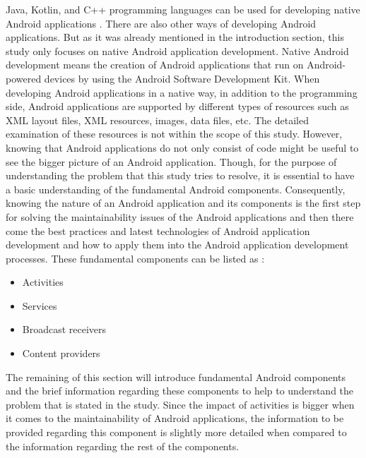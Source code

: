 Java, Kotlin, and C++ programming languages can be used for developing native Android applications \cite{9}. There are also other ways of developing Android applications. But as it was already mentioned in the introduction section, this study only focuses on native Android application development. Native Android development means the creation of Android applications that run on Android-powered devices by using the Android Software Development Kit. When developing Android applications in a native way, in addition to the programming side, Android applications are supported by different types of resources such as XML layout files, XML resources, images, data files, etc. The detailed examination of these resources is not within the scope of this study. However, knowing that Android applications do not only consist of code might be useful to see the bigger picture of an Android application. Though, for the purpose of understanding the problem that this study tries to resolve, it is essential to have a basic understanding of the fundamental Android components. Consequently, knowing the nature of an Android application and its components is the first step for solving the maintainability issues of the Android applications and then there come the best practices and latest technologies of Android application development and how to apply them into the Android application development processes. These fundamental components can be listed as \cite{9}:
\begin{itemize}
    \item Activities
    \item Services
    \item Broadcast receivers
    \item Content providers
\end{itemize}
The remaining of this section will introduce fundamental Android components and the brief information regarding these components to help to understand the problem that is stated in the study. Since the impact of activities is bigger when it comes to the maintainability of Android applications, the information to be provided regarding this component is slightly more detailed when compared to the information regarding the rest of the components.